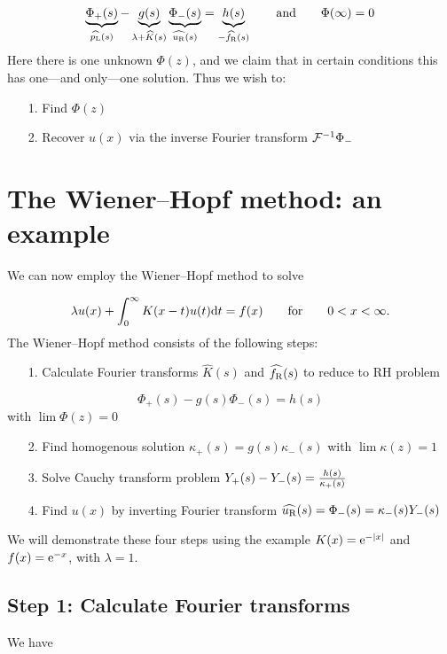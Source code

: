 \documentclass[12pt,a4paper]{article}
\def\qqand{\qquad\hbox{and}\qquad}
\def\qqfor{\qquad\hbox{for}\qquad}
\def\D{ {\rm d} }
\def\E{ {\rm e} }
\def\dt{\D t}
\def\endash{–}
\def\emdash{—}
\begin{document}
\[
\underbrace{\Phi_+(s)}_{\widehat{p_{\rm L}}(s)} - \underbrace{g(s)}_{\lambda + \widehat K(s)} \underbrace{\Phi_-(s)}_{\widehat{u_{\rm R}}(s)} = \underbrace{h(s)}_{-\widehat{f_{\rm R}}(s) } \qqand \Phi(\infty) = 0
\]
Here there is one unknown $\Phi(z)$, and we claim that in certain conditions this has one\ensuremath{\emdash}and only\ensuremath{\emdash}one solution. Thus we wish to:

\begin{itemize}
\item[1. ] Find $\Phi(z)$


\item[2. ] Recover $u(x)$ via the inverse Fourier transform ${\cal F}^{-1} \Phi_-$

\end{itemize}
\section{The Wiener\ensuremath{\endash}Hopf method: an example}
We can now employ the Wiener\ensuremath{\endash}Hopf method to solve

\[
\lambda u(x) + \int_{0}^\infty K(x-t)u(t) \dt = f(x)\qqfor 0 < x < \infty.
\]
The Wiener\ensuremath{\endash}Hopf method consists of the following steps:

\begin{itemize}
\item[1. ] Calculate Fourier transforms $\widehat K(s)$ and $\widehat{f_{\rm R}}(s)$ to reduce to RH problem 

\end{itemize}
\[
\Phi_+(s) -g(s) \Phi_-(s) = h(s)
\]
with $\lim \Phi(z) = 0$

\begin{itemize}
\item[2. ] Find homogenous solution $\kappa_+(s) = g(s) \kappa_-(s)$ with $\lim \kappa(z) = 1$


\item[3. ] Solve Cauchy transform problem $Y_+(s) - Y_-(s) = {h(s) \over \kappa_+(s)}$


\item[4. ] Find $u(x)$ by inverting Fourier transform $\widehat{u_{\rm R}}(s) = \Phi_-(s) = \kappa_-(s) Y_-(s)$

\end{itemize}
We will demonstrate these four steps using the example $K(x) = \E^{-|x|}$ and $f(x) = \E^{-x}$, with $\lambda = 1$.

\subsection{Step 1: Calculate Fourier transforms}
We have 
\end{document}

